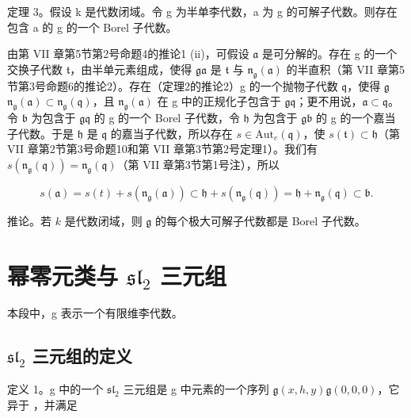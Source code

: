 定理 3。假设 k 是代数闭域。令 g 为半单李代数，a 为 g 的可解子代数。则存在包含 a 的 g 的一个 Borel 子代数。

由第 VII 章第5节第2号命题4的推论1 (ii)，可假设 \(\mathfrak{a}\) 是可分解的。存在 g 的一个交换子代数 \(\mathfrak{t}\)，由半单元素组成，使得 \(\mathfrak{g}\)\(\mathfrak{a}\) 是 \(\mathfrak{t}\) 与 \(\mathfrak{n}_{\mathfrak{g}}(\mathfrak{a})\) 的半直积（第 VII 章第5节第3号命题6的推论2）。存在（定理2的推论2）g 的一个抛物子代数 \(\mathfrak{q}\)，使得 \(\mathfrak{g}\)\(\mathfrak{n}_{\mathfrak{g}}(\mathfrak{a}) \subset \mathfrak{n}_{\mathfrak{g}}(\mathfrak{q})\)，且 \(\mathfrak{n}_{\mathfrak{g}}(\mathfrak{a})\) 在 g 中的正规化子包含于 \(\mathfrak{g}\)\(\mathfrak{q}\)；更不用说，\(\mathfrak{a} \subset \mathfrak{q}\)。令 \(\mathfrak{b}\) 为包含于 \(\mathfrak{g}\)\(\mathfrak{q}\) 的 g 的一个 Borel 子代数，令 \(\mathfrak{h}\) 为包含于 \(\mathfrak{g}\)\(\mathfrak{b}\) 的 g 的一个嘉当子代数。于是 \(\mathfrak{h}\) 是 \(\mathfrak{q}\) 的嘉当子代数，所以存在 \(s \in \mathrm{Aut}_e(\mathfrak{q})\)，使 \(s(\mathfrak{t}) \subset \mathfrak{h}\)（第 VII 章第2节第3号命题10和第 VII 章第3节第2号定理1）。我们有 \(s(\mathfrak{n}_{\mathfrak{g}}(\mathfrak{q})) = \mathfrak{n}_{\mathfrak{g}}(\mathfrak{q})\)（第 VII 章第3节第1号注），所以

\[
s (\mathfrak {a}) = s (t) + s \left(\mathfrak {n} _ {\mathfrak {g}} (\mathfrak {a})\right) \subset \mathfrak {h} + s \left(\mathfrak {n} _ {\mathfrak {g}} (\mathfrak {q})\right) = \mathfrak {h} + \mathfrak {n} _ {\mathfrak {g}} (\mathfrak {q}) \subset \mathfrak {b}.
\]

推论。若 \(k\) 是代数闭域，则 \(\mathfrak{g}\) 的每个极大可解子代数都是 Borel 子代数。

\section{\texorpdfstring{幂零元类与 \(\mathfrak{sl}_2\) 三元组}{\textbackslash mathfrak\{sl\}\_2 三元组}}

本段中，g 表示一个有限维李代数。

\subsection{\texorpdfstring{\(\mathfrak{sl}_2\) 三元组的定义}{\textbackslash mathfrak\{sl\}\_2 三元组的定义}}

定义 1。g 中的一个 \(\mathfrak{sl}_2\) 三元组是 g 中元素的一个序列 \(\mathfrak{g}\)\((x, h, y)\)\(\mathfrak{g}\)\((0, 0, 0)\)，它异于 ，并满足

